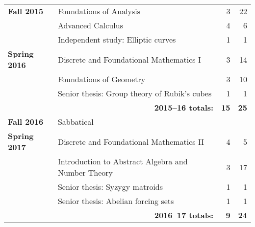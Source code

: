 \documentclass[12pt]{article}
\begin{document}
\begin{center}
\begin{longtable}{@{} l @{\hspace{1ex}} l @{} rr @{}}
\textbf{Fall 2015} & Foundations of Analysis & 3 & 22 \\
 & Advanced Calculus & 4 & 6 \\
 & Independent study: Elliptic curves & 1 & 1 \\
\addlinespace[0.1in]

\textbf{Spring 2016} & Discrete and Foundational Mathematics I & 3 & 14 \\
 & Foundations of Geometry & 3 & 10 \\
 & Senior thesis: Group theory of Rubik's cubes & 1 & 1 \\
 \cmidrule{2-4}
 & \multicolumn{1}{r}{\textbf{2015--16 totals:}} & \textbf{15} & \textbf{25} \\
 \cmidrule{2-4}

\textbf{Fall 2016} & Sabbatical & & \\
\addlinespace[0.1in]

\textbf{Spring 2017} & Discrete and Foundational Mathematics II & 4 & 5 \\
 & Introduction to Abstract Algebra and Number Theory & 3 & 17 \\
 & Senior thesis: Syzygy matroids & 1 & 1 \\
 & Senior thesis: Abelian forcing sets & 1 & 1 \\
 \cmidrule{2-4}
 & \multicolumn{1}{r}{\textbf{2016--17 totals:}} & \textbf{9} & \textbf{24} \\
 \cmidrule{2-4}
 

\bottomrule


\end{longtable}
\end{center}
\end{document}
